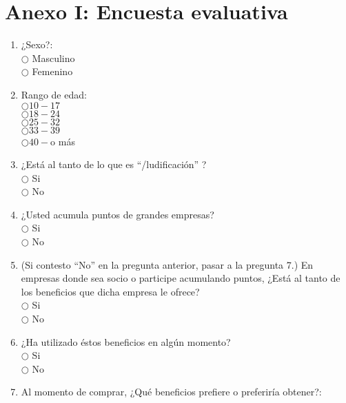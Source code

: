 \section{Anexo I: Encuesta evaluativa}

\begin{enumerate}

\item ¿Sexo?: \\

$\bigcirc$ Masculino \\
$\bigcirc$ Femenino

\item Rango de edad: \\

$\bigcirc 10 - 17$\\
$\bigcirc 18 - 24$\\
$\bigcirc 25 - 32$\\
$\bigcirc 33 - 39$\\
$\bigcirc 40 - $o más

\item ¿Está al tanto de lo que es ``{\gam}/ludificación'' ? \\

$\bigcirc$ Si \\
$\bigcirc$ No

\item ¿Usted acumula puntos de grandes empresas?\\

$\bigcirc$ Si \\
$\bigcirc$ No    

\item  (Si contesto ``No'' en la pregunta anterior, pasar a la pregunta 7.) En empresas donde sea socio o participe acumulando puntos, ¿Está al tanto de los beneficios que dicha empresa le ofrece?\\

$\bigcirc$ Si \\
$\bigcirc$ No

\item ¿Ha utilizado éstos beneficios en algún momento?\\

$\bigcirc$ Si \\
$\bigcirc$ No

\item Al momento de comprar, ¿Qué beneficios prefiere o preferiría obtener?:


\end{enumerate}
